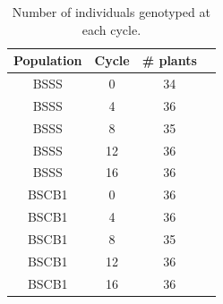 \clearpage

\begin{table}
\caption{Number of individuals genotyped at each cycle.}
\centering
\begin{tabular}{  cccc }
	Population  & Cycle & \# plants &   \\ \hline
	BSSS & 0 & 34 &  \\ 
	BSSS & 4 & 36 &  \\ 
	BSSS & 8 & 35 &  \\ 
	BSSS & 12 & 36 &  \\ 
	BSSS & 16 & 36 &  \\ 
	BSCB1 & 0 & 36 &  \\ 
	BSCB1 & 4 & 36 &  \\ 
	BSCB1 & 8 & 35 &  \\ 
	BSCB1 & 12 & 36 &  \\ 
	BSCB1 & 16 & 36 &  \\ 
\end{tabular}
\label{tab:plants}
\end{table}
\clearpage


